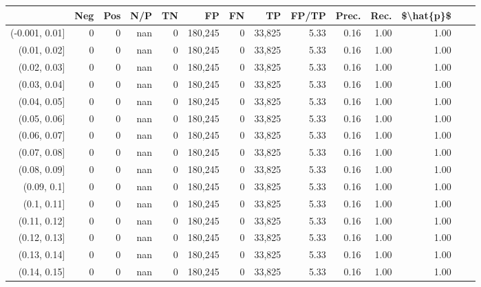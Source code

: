 \begin{tabular}{rrrrrrrrrrrrrr}
\toprule
{} &     Neg &    Pos &     N/P &       TN &       FP &      FN &      TP & FP/TP & Prec. &  Rec. & \$\textbackslash hat\{p\}\$ \\
\midrule
(-0.001, 0.01] &       0 &      0 &     nan &        0 &  180,245 &       0 &  33,825 &  5.33 &  0.16 &  1.00 &      1.00 \\
(0.01, 0.02]   &       0 &      0 &     nan &        0 &  180,245 &       0 &  33,825 &  5.33 &  0.16 &  1.00 &      1.00 \\
(0.02, 0.03]   &       0 &      0 &     nan &        0 &  180,245 &       0 &  33,825 &  5.33 &  0.16 &  1.00 &      1.00 \\
(0.03, 0.04]   &       0 &      0 &     nan &        0 &  180,245 &       0 &  33,825 &  5.33 &  0.16 &  1.00 &      1.00 \\
(0.04, 0.05]   &       0 &      0 &     nan &        0 &  180,245 &       0 &  33,825 &  5.33 &  0.16 &  1.00 &      1.00 \\
(0.05, 0.06]   &       0 &      0 &     nan &        0 &  180,245 &       0 &  33,825 &  5.33 &  0.16 &  1.00 &      1.00 \\
(0.06, 0.07]   &       0 &      0 &     nan &        0 &  180,245 &       0 &  33,825 &  5.33 &  0.16 &  1.00 &      1.00 \\
(0.07, 0.08]   &       0 &      0 &     nan &        0 &  180,245 &       0 &  33,825 &  5.33 &  0.16 &  1.00 &      1.00 \\
(0.08, 0.09]   &       0 &      0 &     nan &        0 &  180,245 &       0 &  33,825 &  5.33 &  0.16 &  1.00 &      1.00 \\
(0.09, 0.1]    &       0 &      0 &     nan &        0 &  180,245 &       0 &  33,825 &  5.33 &  0.16 &  1.00 &      1.00 \\
(0.1, 0.11]    &       0 &      0 &     nan &        0 &  180,245 &       0 &  33,825 &  5.33 &  0.16 &  1.00 &      1.00 \\
(0.11, 0.12]   &       0 &      0 &     nan &        0 &  180,245 &       0 &  33,825 &  5.33 &  0.16 &  1.00 &      1.00 \\
(0.12, 0.13]   &       0 &      0 &     nan &        0 &  180,245 &       0 &  33,825 &  5.33 &  0.16 &  1.00 &      1.00 \\
(0.13, 0.14]   &       0 &      0 &     nan &        0 &  180,245 &       0 &  33,825 &  5.33 &  0.16 &  1.00 &      1.00 \\
(0.14, 0.15]   &       0 &      0 &     nan &        0 &  180,245 &       0 &  33,825 &  5.33 &  0.16 &  1.00 &      1.00 \\

\end{tabular}
